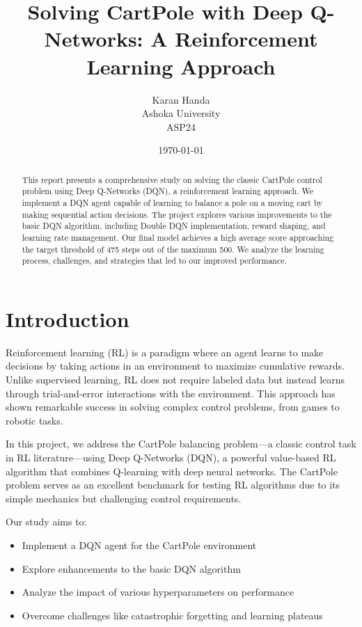 \documentclass[11pt,a4paper]{article}
\title{Solving CartPole with Deep Q-Networks: A Reinforcement Learning Approach}
\author{Karan Handa \\ Ashoka University \\ ASP24}
\date{\today}
\begin{document}
\maketitle

\begin{abstract}
This report presents a comprehensive study on solving the classic CartPole control problem using Deep Q-Networks (DQN), a reinforcement learning approach. We implement a DQN agent capable of learning to balance a pole on a moving cart by making sequential action decisions. The project explores various improvements to the basic DQN algorithm, including Double DQN implementation, reward shaping, and learning rate management. Our final model achieves a high average score approaching the target threshold of 475 steps out of the maximum 500. We analyze the learning process, challenges, and strategies that led to our improved performance.
\end{abstract}

\tableofcontents
\newpage

\section{Introduction}

Reinforcement learning (RL) is a paradigm where an agent learns to make decisions by taking actions in an environment to maximize cumulative rewards. Unlike supervised learning, RL does not require labeled data but instead learns through trial-and-error interactions with the environment. This approach has shown remarkable success in solving complex control problems, from games to robotic tasks.

In this project, we address the CartPole balancing problem—a classic control task in RL literature—using Deep Q-Networks (DQN), a powerful value-based RL algorithm that combines Q-learning with deep neural networks. The CartPole problem serves as an excellent benchmark for testing RL algorithms due to its simple mechanics but challenging control requirements.

Our study aims to:
\begin{itemize}
    \item Implement a DQN agent for the CartPole environment
    \item Explore enhancements to the basic DQN algorithm
    \item Analyze the impact of various hyperparameters on performance
    \item Overcome challenges like catastrophic forgetting and learning plateaus
\end{itemize}
\end{document}
